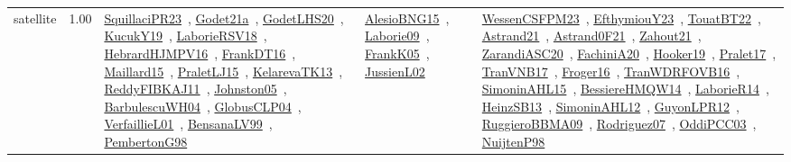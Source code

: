 {\begin{longtable}{p{3cm}r>{\raggedright\arraybackslash}p{6cm}>{\raggedright\arraybackslash}p{6cm}>{\raggedright\arraybackslash}p{8cm}}
\index{satellite}\index{ApplicationAreas!satellite}satellite &  1.00 & \href{../works/SquillaciPR23.pdf}{SquillaciPR23}~\cite{SquillaciPR23}, \href{../works/Godet21a.pdf}{Godet21a}~\cite{Godet21a}, \href{../works/GodetLHS20.pdf}{GodetLHS20}~\cite{GodetLHS20}, \href{../works/KucukY19.pdf}{KucukY19}~\cite{KucukY19}, \href{../works/LaborieRSV18.pdf}{LaborieRSV18}~\cite{LaborieRSV18}, \href{../works/HebrardHJMPV16.pdf}{HebrardHJMPV16}~\cite{HebrardHJMPV16}, \href{../works/FrankDT16.pdf}{FrankDT16}~\cite{FrankDT16}, \href{../works/Maillard15.pdf}{Maillard15}~\cite{Maillard15}, \href{../works/PraletLJ15.pdf}{PraletLJ15}~\cite{PraletLJ15}, \href{../works/KelarevaTK13.pdf}{KelarevaTK13}~\cite{KelarevaTK13}, \href{../works/ReddyFIBKAJ11.pdf}{ReddyFIBKAJ11}~\cite{ReddyFIBKAJ11}, \href{../works/Johnston05.pdf}{Johnston05}~\cite{Johnston05}, \href{../works/BarbulescuWH04.pdf}{BarbulescuWH04}~\cite{BarbulescuWH04}, \href{../works/GlobusCLP04.pdf}{GlobusCLP04}~\cite{GlobusCLP04}, \href{../works/VerfaillieL01.pdf}{VerfaillieL01}~\cite{VerfaillieL01}, \href{../works/BensanaLV99.pdf}{BensanaLV99}~\cite{BensanaLV99}, \href{../works/PembertonG98.pdf}{PembertonG98}~\cite{PembertonG98} & \href{../works/AlesioBNG15.pdf}{AlesioBNG15}~\cite{AlesioBNG15}, \href{../works/Laborie09.pdf}{Laborie09}~\cite{Laborie09}, \href{../works/FrankK05.pdf}{FrankK05}~\cite{FrankK05}, \href{../works/JussienL02.pdf}{JussienL02}~\cite{JussienL02} & \href{../works/WessenCSFPM23.pdf}{WessenCSFPM23}~\cite{WessenCSFPM23}, \href{../works/EfthymiouY23.pdf}{EfthymiouY23}~\cite{EfthymiouY23}, \href{../works/TouatBT22.pdf}{TouatBT22}~\cite{TouatBT22}, \href{../works/Astrand21.pdf}{Astrand21}~\cite{Astrand21}, \href{../works/Astrand0F21.pdf}{Astrand0F21}~\cite{Astrand0F21}, \href{../works/Zahout21.pdf}{Zahout21}~\cite{Zahout21}, \href{../works/ZarandiASC20.pdf}{ZarandiASC20}~\cite{ZarandiASC20}, \href{../works/FachiniA20.pdf}{FachiniA20}~\cite{FachiniA20}, \href{../works/Hooker19.pdf}{Hooker19}~\cite{Hooker19}, \href{../works/Pralet17.pdf}{Pralet17}~\cite{Pralet17}, \href{../works/TranVNB17.pdf}{TranVNB17}~\cite{TranVNB17}, \href{../works/Froger16.pdf}{Froger16}~\cite{Froger16}, \href{../works/TranWDRFOVB16.pdf}{TranWDRFOVB16}~\cite{TranWDRFOVB16}, \href{../works/SimoninAHL15.pdf}{SimoninAHL15}~\cite{SimoninAHL15}, \href{../works/BessiereHMQW14.pdf}{BessiereHMQW14}~\cite{BessiereHMQW14}, \href{../works/LaborieR14.pdf}{LaborieR14}~\cite{LaborieR14}, \href{../works/HeinzSB13.pdf}{HeinzSB13}~\cite{HeinzSB13}, \href{../works/SimoninAHL12.pdf}{SimoninAHL12}~\cite{SimoninAHL12}, \href{../works/GuyonLPR12.pdf}{GuyonLPR12}~\cite{GuyonLPR12}, \href{../works/RuggieroBBMA09.pdf}{RuggieroBBMA09}~\cite{RuggieroBBMA09}, \href{../works/Rodriguez07.pdf}{Rodriguez07}~\cite{Rodriguez07}, \href{../works/OddiPCC03.pdf}{OddiPCC03}~\cite{OddiPCC03}, \href{../works/NuijtenP98.pdf}{NuijtenP98}~\cite{NuijtenP98}\\

\end{longtable}}
